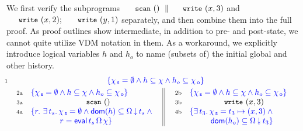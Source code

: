 We first verify the subprograms $\esc{scan}~()~\parallel
\esc{write}~(x,3)$ and $\esc{write}~(x,2);\ \esc{write}~(y,1)$
separately, and then combine them into the full proof. As proof
outlines show intermediate, in addition to pre- and post-state, we
cannot quite utilize VDM notation in them. As a workaround, we
explicitly introduce logical variables $h$ and $h_o$ to name (subsets
of) the initial global and other history.
%
%
{
\[
\!\!\!\!\!\begin{array}{l c} \num{1} &
 {\specK{\{ \histS = \hempty \wedge h \subseteq \hist \wedge h_o
                           \subseteq \histO \}}} \\[3pt]
& \!\!\!\!\!\! \begin{tabular}{l || l}
     \begin{array}[t]{l l}
       \num{2a} &
       \specK{\{ \histS = \hempty \wedge h \subseteq \hist \wedge h_o \subseteq \histO \}}\\
       \num{3a} & \multicolumn{1}{c}{\esc{scan}~()} \\
       \num{4a} &
       \specK{\{ r\ldot\, \exists\, t_s\ldot
         \histS = \hempty \wedge  \dom{h} \subseteq \ideal{\stableorder}{t_s} \wedge \hbox{}}\\
       &
       \specK{\phantom{\{r\ldot\, \exists\, t_s\ldot}\,
         r = \eval\, t_s\, \stableorder\, \hist\}}
     \end{array}~&~
     \!\!\!\begin{array}[t]{r l}
       \num{2b} &
       \specK{\{ \histS = \hempty \wedge h \subseteq \hist \wedge h_o \subseteq \histO \}} \\       
       \num{3b} & \multicolumn{1}{c}{\esc{write}~(x,3)}\\
       \num{4b} &
       \specK{\{ \exists\, t_3\ldot
         \histS = t_3 \hpts (x,3) \wedge \hbox{}}\\
       & \specK{\phantom{\{\exists\, t_3\ldot}\,
         \dom{h_o} \subseteq \sideal{\stableorder}{t_3}\}}
     \end{array}
   \end{tabular}\\[3pt]

\end{array}\]}
